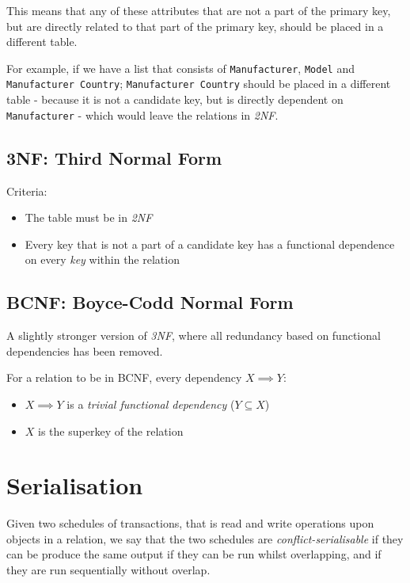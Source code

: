 \documentclass{article}
\begin{document}
This means that any of these attributes that are not a part of the primary key, but are directly related to that part of the primary key, should be placed in a different table.

For example, if we have a list that consists of \texttt{Manufacturer}, \texttt{Model} and \texttt{Manufacturer Country}; \texttt{Manufacturer Country} should be placed in a different table - because it is not a candidate key, but is directly dependent on \texttt{Manufacturer} - which would leave the relations in \textit{2NF}.

\subsection{3NF: Third Normal Form}

Criteria:

\begin{itemize}
\item
  The table must be in \textit{2NF}
\item
  Every key that is not a part of a candidate key has a functional dependence on every \textit{key} within the relation
\end{itemize}

\subsection{BCNF: Boyce-Codd Normal Form}

A slightly stronger version of \textit{3NF}, where all redundancy based on functional dependencies has been removed.

For a relation to be in BCNF, every dependency $X \implies Y$:

\begin{itemize}
\item 
  $X \implies Y$ is a \textit{trivial functional dependency} ($Y \subseteq X$)
\item
  $X$ is the superkey of the relation
\end{itemize}

\section{Serialisation}

Given two schedules of transactions, that is read and write operations upon objects in a relation, we say that the two schedules are \textit{conflict-serialisable} if they can be produce the same output if they can be run whilst overlapping, and if they are run sequentially without overlap.
\end{document}
